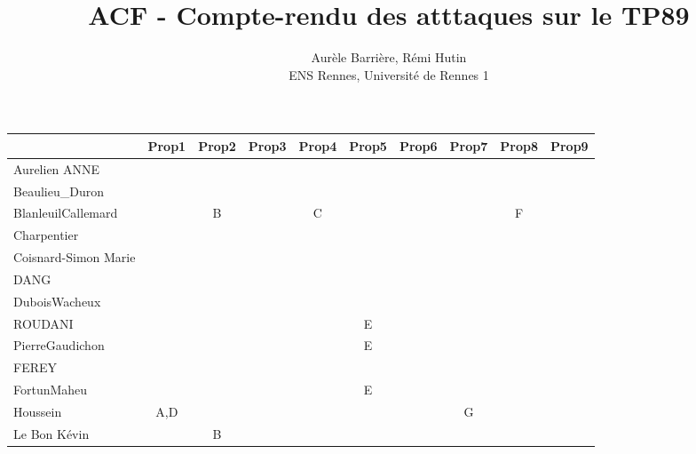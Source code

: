 \documentclass[a4paper]{article}
\begin{document}
\title{ACF - Compte-rendu des atttaques sur le TP89}
\author{Aurèle Barrière, Rémi Hutin \\ ENS Rennes, Université de Rennes 1}

\maketitle

\begin{table}[h!]
\small
\begin{tabular}{|l|c|c|c|c|c|c|c|c|c|} 
   \hline
                            & Prop1 & Prop2 & Prop3 & Prop4 & Prop5 & Prop6 & Prop7 & Prop8 & Prop9 \\ \hline \hline
    Aurelien ANNE           &       &       &       &       &       &       &       &       &       \\ \hline
    Beaulieu\_Duron         &       &       &       &       &       &       &       &       &       \\ \hline
    BlanleuilCallemard      &       & B     &       & C     &       &       &       & F     &       \\ \hline
    Charpentier             &       &       &       &       &       &       &       &       &       \\ \hline
    Coisnard-Simon Marie    &       &       &       &       &       &       &       &       &       \\ \hline
    DANG                    &       &       &       &       &       &       &       &       &       \\ \hline
    DuboisWacheux           &       &       &       &       &       &       &       &       &       \\ \hline
    ROUDANI                 &       &       &       &       & E     &       &       &       &       \\ \hline
    PierreGaudichon         &       &       &       &       & E     &       &       &       &       \\ \hline
    FEREY                   &       &       &       &       &       &       &       &       &       \\ \hline
    FortunMaheu             &       &       &       &       & E     &       &       &       &       \\ \hline
    Houssein                & A,D   &       &       &       &       &       & G     &       &       \\ \hline
    Le Bon Kévin            &       & B     &       &       &       &       &       &       &       \\ \hline

\end{tabular}
\end{table}
\end{document}
